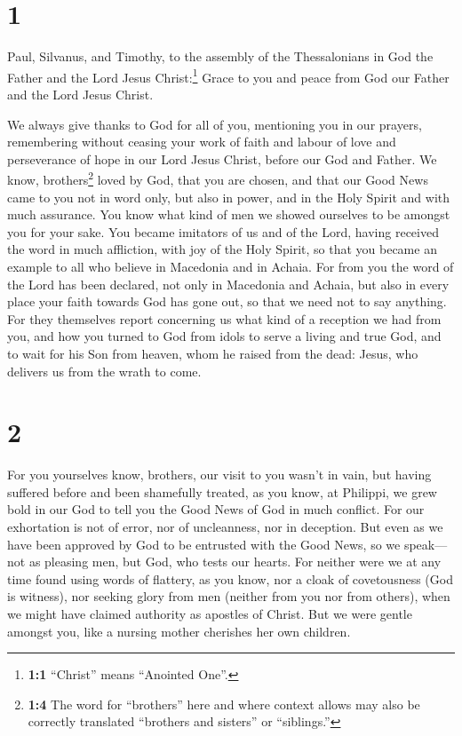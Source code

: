 \hypertarget{section}{%
\section{1}\label{section}}

 Paul, Silvanus, and Timothy, to the assembly of the
Thessalonians in God the Father and the Lord Jesus Christ:\footnote{\textbf{1:1}
  ``Christ'' means ``Anointed One''.} Grace to you and peace from God
our Father and the Lord Jesus Christ.

 We always give thanks to God for all of you, mentioning
you in our prayers,  remembering without ceasing your work
of faith and labour of love and perseverance of hope in our Lord Jesus
Christ, before our God and Father.  We know,
brothers\footnote{\textbf{1:4} The word for ``brothers'' here and where
  context allows may also be correctly translated ``brothers and
  sisters'' or ``siblings.''} loved by God, that you are chosen,
 and that our Good News came to you not in word only, but
also in power, and in the Holy Spirit and with much assurance. You know
what kind of men we showed ourselves to be amongst you for your sake.
 You became imitators of us and of the Lord, having
received the word in much affliction, with joy of the Holy Spirit,
 so that you became an example to all who believe in
Macedonia and in Achaia.  For from you the word of the
Lord has been declared, not only in Macedonia and Achaia, but also in
every place your faith towards God has gone out, so that we need not to
say anything.  For they themselves report concerning us
what kind of a reception we had from you, and how you turned to God from
idols to serve a living and true God,  and to wait for
his Son from heaven, whom he raised from the dead: Jesus, who delivers
us from the wrath to come.

\hypertarget{section-1}{%
\section{2}\label{section-1}}

 For you yourselves know, brothers, our visit to you
wasn't in vain,  but having suffered before and been
shamefully treated, as you know, at Philippi, we grew bold in our God to
tell you the Good News of God in much conflict.  For our
exhortation is not of error, nor of uncleanness, nor in deception.
 But even as we have been approved by God to be entrusted
with the Good News, so we speak---not as pleasing men, but God, who
tests our hearts.  For neither were we at any time found
using words of flattery, as you know, nor a cloak of covetousness (God
is witness),  nor seeking glory from men (neither from you
nor from others), when we might have claimed authority as apostles of
Christ.  But we were gentle amongst you, like a nursing
mother cherishes her own children.

